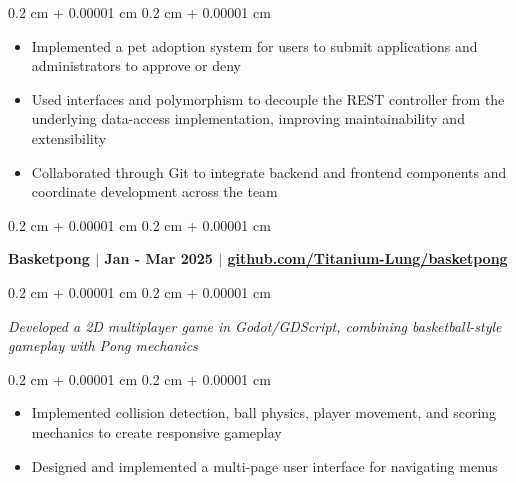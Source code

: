 \documentclass[10pt, letterpaper]{article}
\newenvironment{highlights}{
    \begin{itemize}[
        topsep=0.10 cm,
        parsep=0.10 cm,
        partopsep=0pt,
        itemsep=0pt,
        leftmargin=0.4 cm + 10pt
    ]
}{
    \end{itemize}
} %
\newenvironment{onecolentry}{
    \begin{adjustwidth}{
        0.2 cm + 0.00001 cm
    }{
        0.2 cm + 0.00001 cm
    }
}{
    \end{adjustwidth}
} %
\let\hrefWithoutArrow\href
\renewcommand{\href}[2]{\hrefWithoutArrow{#1}{\ifthenelse{\equal{#2}{}}{ }{#2 }\raisebox{.15ex}{\footnotesize \faExternalLink*}}}
\begin{document}
        \vspace{0.10 cm}
        \begin{onecolentry}
            \begin{highlights}
                \item Implemented a pet adoption system for users to submit applications and administrators to approve or deny %
                \item Used interfaces and polymorphism to decouple the REST controller from the underlying data-access implementation, improving maintainability and extensibility
                \item Collaborated through Git to integrate backend and frontend components and coordinate development across the team
            \end{highlights}
        \end{onecolentry}

        \vspace{0.2 cm}

        \begin{onecolentry}
            \textbf{Basketpong $|$ Jan - Mar 2025 $|$ \hrefWithoutArrow{https://github.com/Titanium-Lung/basketpong}{\color{black}\underline{github.com/Titanium-Lung/basketpong}}}
        \end{onecolentry}

        \vspace{0.10 cm}
        
        \begin{onecolentry}
            \textit{Developed a 2D multiplayer game in Godot/GDScript, combining basketball-style gameplay with Pong mechanics}
        \end{onecolentry}

        \vspace{0.10 cm}
        \begin{onecolentry}
            \begin{highlights}
                \item Implemented collision detection, ball physics, player movement, and scoring mechanics to create responsive gameplay
                \item Designed and implemented a multi-page user interface for navigating menus %
            \end{highlights}
        \end{onecolentry}

        \vspace{0.2 cm}        
    
\end{document}

